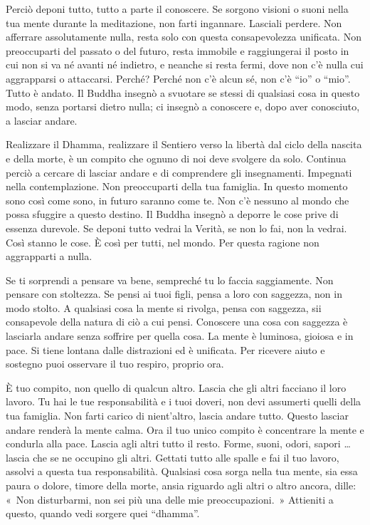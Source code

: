 Perciò deponi tutto, tutto a parte il conoscere. Se sorgono visioni o
suoni nella tua mente durante la meditazione, non farti ingannare.
Lasciali perdere. Non afferrare assolutamente nulla, resta solo con
questa consapevolezza unificata. Non preoccuparti del passato o del
futuro, resta immobile e raggiungerai il posto in cui non si va né
avanti né indietro, e neanche si resta fermi, dove non c'è nulla cui
aggrapparsi o attaccarsi. Perché? Perché non c'è alcun sé, non c'è
``io'' o ``mio''. Tutto è andato. Il Buddha insegnò a svuotare se stessi
di qualsiasi cosa in questo modo, senza portarsi dietro nulla; ci
insegnò a conoscere e, dopo aver conosciuto, a lasciar andare.

Realizzare il Dhamma, realizzare il Sentiero verso la libertà dal ciclo
della nascita e della morte, è un compito che ognuno di noi deve
svolgere da solo. Continua perciò a cercare di lasciar andare e di
comprendere gli insegnamenti. Impegnati nella contemplazione. Non
preoccuparti della tua famiglia. In questo momento sono così come sono,
in futuro saranno come te. Non c'è nessuno al mondo che possa sfuggire a
questo destino. Il Buddha insegnò a deporre le cose prive di essenza
durevole. Se deponi tutto vedrai la Verità, se non lo fai, non la
vedrai. Così stanno le cose. È così per tutti, nel mondo. Per questa
ragione non aggrapparti a nulla.

Se ti sorprendi a pensare va bene, sempreché tu lo faccia saggiamente.
Non pensare con stoltezza. Se pensi ai tuoi figli, pensa a loro con
saggezza, non in modo stolto. A qualsiasi cosa la mente si rivolga,
pensa con saggezza, sii consapevole della natura di ciò a cui pensi.
Conoscere una cosa con saggezza è lasciarla andare senza soffrire per
quella cosa. La mente è luminosa, gioiosa e in pace. Si tiene lontana
dalle distrazioni ed è unificata. Per ricevere aiuto e sostegno puoi
osservare il tuo respiro, proprio ora.

È tuo compito, non quello di qualcun altro. Lascia che gli altri
facciano il loro lavoro. Tu hai le tue responsabilità e i tuoi doveri,
non devi assumerti quelli della tua famiglia. Non farti carico di
nient'altro, lascia andare tutto. Questo lasciar andare renderà la mente
calma. Ora il tuo unico compito è concentrare la mente e condurla alla
pace. Lascia agli altri tutto il resto. Forme, suoni, odori, sapori \ldots{}
lascia che se ne occupino gli altri. Gettati tutto alle spalle e fai il
tuo lavoro, assolvi a questa tua responsabilità. Qualsiasi cosa sorga
nella tua mente, sia essa paura o dolore, timore della morte, ansia
riguardo agli altri o altro ancora, dille: «~Non disturbarmi, non sei
più una delle mie preoccupazioni.~» Attieniti a questo, quando vedi
sorgere quei ``dhamma''.


